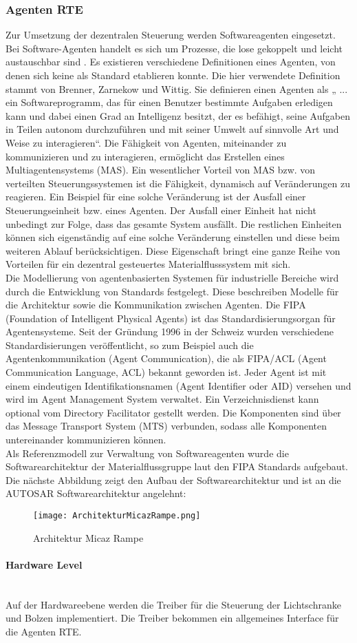 \subsubsection{Agenten RTE}

Zur Umsetzung der dezentralen Steuerung werden Softwareagenten eingesetzt. Bei Software-Agenten handelt es sich um Prozesse, die lose gekoppelt 
und leicht austauschbar sind \cite[vgl.][S. 31-37]{GH:2010}. Es existieren verschiedene Definitionen eines Agenten, von denen
sich keine als Standard etablieren konnte. Die hier verwendete Definition stammt von
Brenner, Zarnekow und Wittig. Sie definieren einen Agenten als „ ... ein Softwareprogramm,
das für einen Benutzer bestimmte Aufgaben erledigen kann und dabei einen Grad an
Intelligenz besitzt, der es befähigt, seine Aufgaben in Teilen autonom durchzuführen und mit
seiner Umwelt auf sinnvolle Art und Weise zu interagieren“\cite{BZW:1998}. Die Fähigkeit von Agenten, miteinander zu kommunizieren 
und zu interagieren, ermöglicht das Erstellen eines Multiagentensystems (MAS). Ein wesentlicher Vorteil von MAS 
bzw. von verteilten Steuerungssystemen ist die Fähigkeit, dynamisch auf Veränderungen zu reagieren. Ein Beispiel für eine solche Veränderung ist der
Ausfall einer Steuerungseinheit bzw. eines Agenten. Der Ausfall einer Einheit hat nicht unbedingt zur Folge, dass das gesamte System ausfällt. 
Die restlichen Einheiten können sich eigenständig auf eine solche Veränderung einstellen und diese beim weiteren Ablauf
berücksichtigen\cite[S. 13]{Roidl:2012}. Diese Eigenschaft bringt eine ganze Reihe von Vorteilen für ein dezentral
gesteuertes Materialflusssystem mit sich.\\
Die Modellierung von agentenbasierten Systemen für industrielle Bereiche wird durch die
Entwicklung von Standards festgelegt. Diese beschreiben Modelle für die Architektur
sowie die Kommunikation zwischen Agenten. Die FIPA (Foundation of Intelligent Physical Agents) ist das Standardisierungsorgan für Agentensysteme.
Seit der Gründung 1996 in der Schweiz wurden verschiedene Standardisierungen veröffentlicht, so zum Beispiel auch die Agentenkommunikation (Agent Communication), die als FIPA/ACL (Agent Communication Language, ACL) bekannt geworden ist. Jeder Agent ist mit einem eindeutigen
Identifikationsnamen (Agent Identifier oder AID) versehen und wird im Agent Management System verwaltet\cite[S. 24]{Roidl:2012}.
Ein Verzeichnisdienst kann optional vom Directory Facilitator gestellt
werden. Die Komponenten sind über das Message Transport System (MTS) verbunden,
sodass alle Komponenten untereinander kommunizieren können\cite[S. 24]{Roidl:2012}. \\
Als Referenzmodell zur Verwaltung von Softwareagenten wurde die Softwarearchitektur der Materialflussgruppe laut den FIPA Standards aufgebaut. 
Die nächste Abbildung zeigt den Aufbau der Softwarearchitektur und ist an die AUTOSAR Softwarearchitektur angelehnt:
\begin{figure}[h!]
	\centering
		\texttt{[image: ArchitekturMicazRampe.png]}
	\caption{Architektur Micaz Rampe\cite{Stasch:Hahn}}
	\label{ArchitekturMicazRampe}
\end{figure}
\paragraph{Hardware Level}\mbox{} \\
Auf der Hardwareebene werden die Treiber für die Steuerung der Lichtschranke und Bolzen implementiert. Die Treiber bekommen ein
allgemeines Interface für die Agenten RTE.